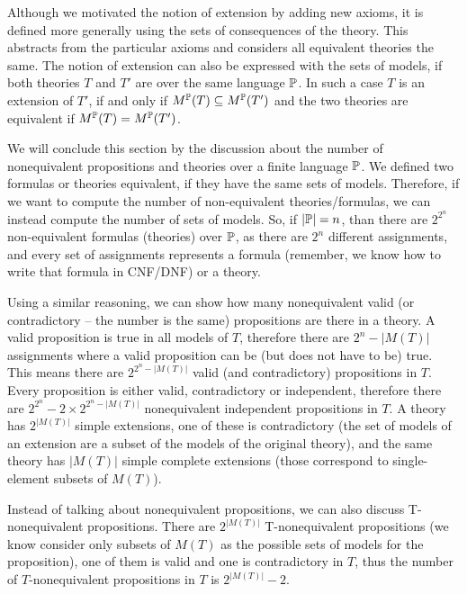 Although we motivated the notion of extension by adding new axioms, it is defined more generally using the sets of consequences of the theory. This abstracts from the particular axioms and considers all equivalent theories the same. The notion of extension can also be expressed with the sets of models, if both theories $T$ and $T'$ are over the same language $\mathbb{P}$. In such a case $T$ is an extension of $T'$, if and only if $M^\mathbb{P}(T) \subseteq M^\mathbb{P}(T')$ and the two theories are equivalent if $M^\mathbb{P}(T)=M^\mathbb{P}(T')$.

We will conclude this section by the discussion about the number of nonequivalent propositions and theories over a finite language $\mathbb{P}$. We defined two formulas or theories equivalent, if they have the same sets of models. Therefore, if we want to compute the number of non-equivalent theories/formulas, we can instead compute the number of sets of models. So, if $|\mathbb{P}| = n$, than there are $2^{2^n}$ non-equivalent formulas (theories) over $\mathbb{P}$, as there are $2^n$ different assignments, and every set of assignments represents a formula (remember, we know how to write that formula in CNF/DNF) or a theory. 

Using a similar reasoning, we can show how many nonequivalent valid (or contradictory -- the number is the same) propositions are there in a theory. A valid proposition is true in all models of $T$, therefore there are $2^n-|M(T)|$ assignments where a valid proposition can be (but does not have to be) true. This means there are $2^{2^n-|M(T)|}$ valid (and contradictory) propositions in $T$. Every proposition is either valid, contradictory or independent, therefore there are $2^{2^n} - 2\times2^{2^n-|M(T)|}$ nonequivalent independent propositions in $T$. A theory has $2^{|M(T)|}$ simple extensions, one of these is contradictory (the set of models of an extension are a subset of the models of the original theory), and the same theory has $|M(T)|$ simple complete extensions (those correspond to single-element subsets of $M(T)$).

Instead of talking about nonequivalent propositions, we can also discuss T-nonequivalent propositions. There are $2^{|M(T)|}$ T-nonequivalent propositions (we know consider only subsets of $M(T)$ as the possible sets of models for the proposition), one of them is valid and one is contradictory in $T$, thus the number of $T$-nonequivalent propositions in $T$ is $2^{|M(T)|}-2$.

